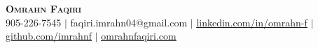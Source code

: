 \begin{center}
    \textbf{\Huge \scshape Omrahn Faqiri} \\ \vspace{1pt}
    \small 905-226-7545 $|$ {faqiri.imrahn04@gmail.com} $|$ 
    \href{https://www.linkedin.com/in/omrahn-f/}{\underline{linkedin.com/in/omrahn-f}} $|$ 
    \href{https://github.com/imrahnf}{\underline{github.com/imrahnf}} $|$
    \href{https://www.omrahnfaqiri.com}{\underline{omrahnfaqiri.com}}
\end{center}
